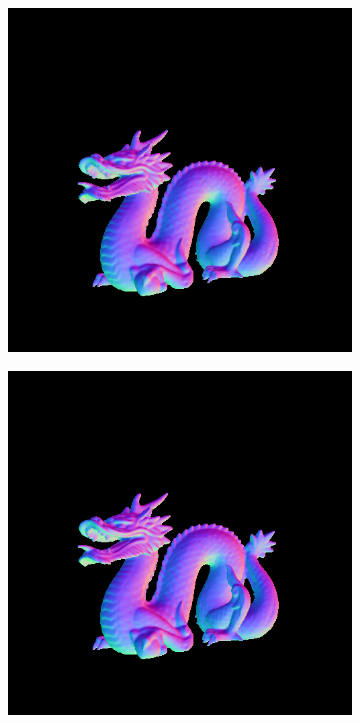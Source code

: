 \begin{figure}[H]
\begin{subfigure}[b]{0.24\linewidth}
	\end{subfigure}
	\begin{subfigure}[b]{0.24\linewidth}
		\includegraphics[width=\linewidth]{./Figures/comparison_512/fancy_eval_14_normal_NNNN-512.png}
	\end{subfigure}
	\begin{subfigure}[b]{0.24\linewidth}
		\includegraphics[width=\linewidth]{./Figures/comparison_512/fancy_eval_14_normal_Trip-Net-512.png}
	\end{subfigure}
	

\end{figure}

